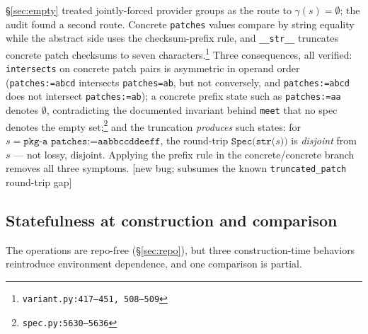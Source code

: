 \documentclass[11pt]{article}
\theoremstyle{definition}
\theoremstyle{remark}
\newcommand{\den}[1]{\gamma(#1)}
\newcommand{\code}[1]{\texttt{#1}}
\newcommand{\src}[1]{\footnote{\code{#1}}}
\begin{document}
\S\ref{sec:empty} treated jointly-forced provider groups as the route to
$\den{s} = \emptyset$; the audit found a second route.  Concrete
\code{patches} values compare by string equality while the abstract side uses
the checksum-prefix rule, and \code{\_\_str\_\_} truncates concrete patch
checksums to seven characters.\src{variant.py:417--451, 508--509}  Three
consequences, all verified: \code{intersects} on concrete patch pairs is
asymmetric in operand order (\code{patches:=abcd} intersects
\code{patches=ab}, but not conversely, and \code{patches:=abcd} does not
intersect \code{patches:=ab}); a concrete prefix state such as
\code{patches:=aa} denotes $\emptyset$, contradicting the documented
invariant behind \code{meet} that no spec denotes the empty
set;\src{spec.py:5630--5636} and the truncation \emph{produces} such states:
for $s = \code{pkg-a patches:=aabbccddeeff}$, the round-trip
$\code{Spec(str(}s\code{))}$ is \emph{disjoint} from $s$ --- not lossy,
disjoint.  Applying the prefix rule in the concrete/concrete branch removes
all three symptoms.  [new bug; subsumes the known \code{truncated\_patch}
round-trip gap]

\subsection{Statefulness at construction and comparison}\label{sec:audit-state}

The operations are repo-free (\S\ref{sec:repo}), but three construction-time
behaviors reintroduce environment dependence, and one comparison is partial.
\end{document}
